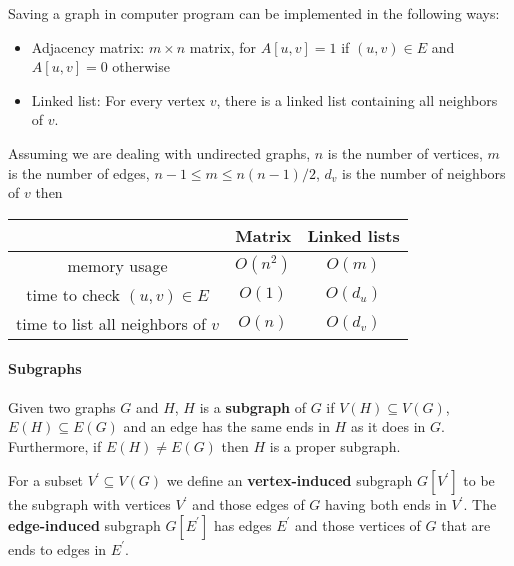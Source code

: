                     Saving a graph in computer program can be implemented in the following ways:
                    \begin{itemize}
                        \item Adjacency matrix: $m \times n$ matrix, for $A[u, v] = 1$ if $(u, v) \in E$ and $A[u, v] = 0$ otherwise
                        \item Linked list: For every vertex $v$, there is a linked list containing all neighbors of $v$.
                    \end{itemize}
                    Assuming we are dealing with undirected graphs, $n$ is the number of vertices, $m$ is the number of edges, $n - 1 \le m \le n(n-1)/2$, $d_v$ is the number of neighbors of $v$ then
                    \begin{table}[H]
                        \centering
                        \begin{tabular}{|c|c|c|}
                            \hline
                             & Matrix & Linked lists\\
                            \hline
                            memory usage & $O(n^2)$ & $O(m)$\\
                            \hline
                            time to check $(u, v) \in E$ & $O(1)$ & $O(d_u)$\\
                            \hline
                            time to list all neighbors of $v$ & $O(n)$ & $O(d_v)$\\
                            \hline
                        \end{tabular}
                    \end{table}

                \paragraph{Subgraphs}
                    \begin{definition}[Subgraph]
                        Given two graphs $G$ and $H$, $H$ is a \textbf{subgraph} of $G$ if $V(H)\subseteq V(G)$, $E(H)\subseteq E(G)$ and an edge has the same ends in $H$ as it does in $G$. Furthermore, if $E(H)\neq E(G)$ then $H$ is a proper subgraph.
                    \end{definition}

                    \begin{definition}
                        For a subset $V^\prime \subseteq V(G)$ we define an \textbf{vertex-induced} subgraph $G[V^\prime ]$ to be the subgraph with vertices $V^\prime$ and those edges of $G$ having both ends in $V^\prime$. The \textbf{edge-induced} subgraph $G[E^\prime ]$ has edges $E^\prime$ and those vertices of $G$ that are ends to edges in $E^\prime$.
                    \end{definition}

